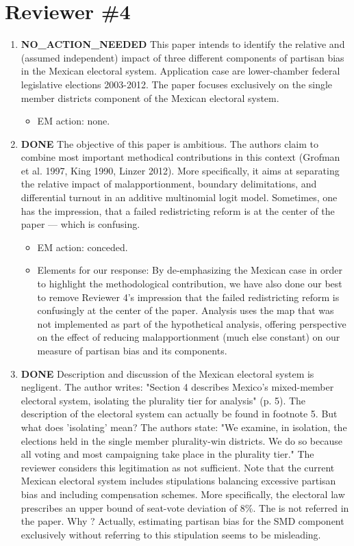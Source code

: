 \documentclass{article}
\begin{document}
\section{Reviewer \#4}
\label{sec:orgheadline31}
\begin{enumerate}
\item {\bfseries\sffamily NO\_ACTION\_NEEDED} This paper intends to identify the relative and (assumed independent) impact of three different components of partisan bias  in the Mexican electoral system. Application case are lower-chamber federal legislative elections 2003-2012. The paper focuses exclusively on the single member districts  component of the Mexican electoral system.
\label{sec:orgheadline21}
\begin{itemize}
\item EM action: none.
\end{itemize}
\item {\bfseries\sffamily DONE} The objective of this paper is ambitious. The authors claim to combine most important methodical contributions in this context (Grofman et al. 1997, King 1990, Linzer 2012).  More specifically, it aims at separating the relative impact of malapportionment, boundary delimitations, and differential turnout in an additive multinomial logit model. Sometimes, one has the impression, that a failed redistricting reform is at the center of the paper --- which is confusing.
\label{sec:orgheadline22}
\begin{itemize}
\item EM action: conceded.
\item Elements for our response: By de-emphasizing the Mexican case in order to highlight the methodological contribution, we have also done our best to remove Reviewer 4's impression that the failed redistricting reform is confusingly at the center of the paper. Analysis uses the map that was not implemented as part of the hypothetical analysis, offering perspective on the effect of reducing malapportionment (much else constant) on our measure of partisan bias and its components.
\end{itemize}
\item {\bfseries\sffamily DONE} Description and discussion of the Mexican electoral system is negligent. The author writes: "Section 4 describes Mexico's mixed-member electoral system, isolating the plurality tier for analysis" (p. 5). The description of the electoral system can actually be found in footnote 5. But  what does 'isolating' mean? The authors state: "We examine, in isolation, the elections held in the single member plurality-win districts. We do so because all voting and most campaigning take place in the plurality tier." The reviewer considers this legitimation as not sufficient. Note that the current Mexican electoral system includes stipulations balancing excessive partisan bias and including compensation schemes. More specifically, the electoral law prescribes an upper bound of seat-vote deviation of 8\%. The is not referred in the paper. Why ? Actually, estimating partisan bias for the SMD component exclusively without referring to this stipulation seems to be misleading.

\end{enumerate}
\end{document}
